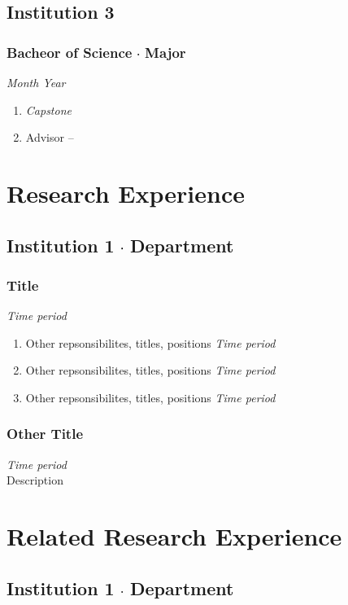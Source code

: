 \documentclass[11pt,letterpaper]{article}
\newcommand*\sq{\mathbin{\vcenter{\hbox{\rule{.3ex}{.3ex}}}}} %
\begin{document}
\subsection*{Institution 3}
\subsubsection*{Bacheor of Science $\sq$ Major}\hfill{\textit{Month Year}}
\begin{enumerate}[leftmargin=*,topsep=0pt,itemsep=-1ex,partopsep=1ex,parsep=1ex,label=(\arabic*)]
    \item[]\textit{Capstone}
    \item[]Advisor -- 
\end{enumerate}


\section*{Research Experience}
\subsection*{Institution 1 $\sq$ Department}
\subsubsection*{Title}\hfill{\textit{Time period}}
\begin{enumerate}[leftmargin=*,topsep=0pt,itemsep=-1ex,partopsep=1ex,parsep=1ex,label=(\arabic*)]
    \item[]\indent\indent Other repsonsibilites, titles, positions \hfill{\textit{Time period}}
    \item[]\indent\indent Other repsonsibilites, titles, positions \hfill{\textit{Time period}}
    \item[]\indent\indent Other repsonsibilites, titles, positions \hfill{\textit{Time period}}
\end{enumerate}
\subsubsection*{Other Title}\hfill{\textit{Time period}}\\
Description


\section*{Related Research Experience}
\subsection*{Institution 1 $\sq$ Department}
\end{document}
